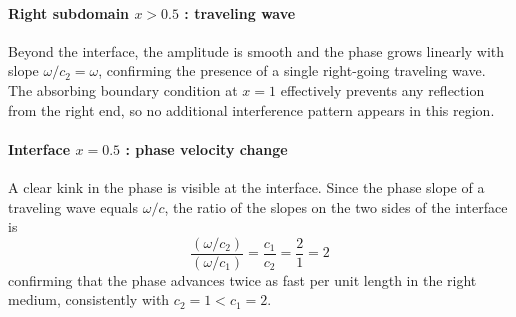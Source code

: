 \paragraph{Right subdomain \(x > 0.5\) : traveling wave}
Beyond the interface, the amplitude is smooth and the phase grows linearly with slope \(\omega/c_2 = \omega\), confirming the presence of a single right-going traveling wave. The absorbing boundary condition at \(x = 1\) effectively prevents any reflection from the right end, so no additional interference pattern appears in this region.

\paragraph{Interface \(x = 0.5\) : phase velocity change}
A clear kink in the phase is visible at the interface. Since the phase slope of a traveling wave equals \(\omega/c\), the ratio of the slopes on the two sides of the interface is
\[
\frac{(\omega/c_2)}{(\omega/c_1)} = \frac{c_1}{c_2} = \frac{2}{1} = 2
\]
confirming that the phase advances twice as fast per unit length in the right medium, consistently with \(c_2 = 1 < c_1 = 2\).